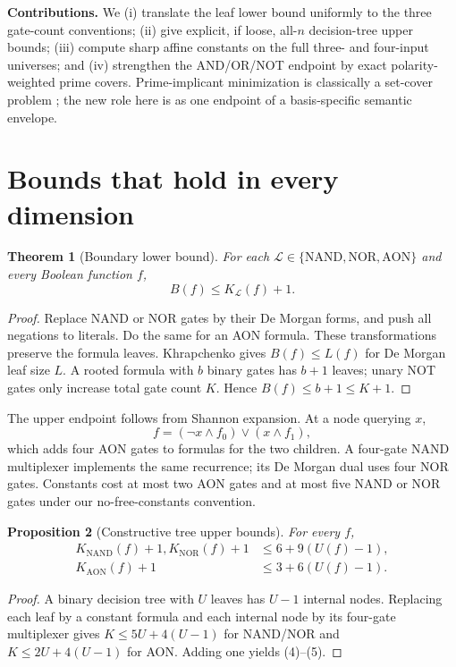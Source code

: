 \documentclass[10pt]{article}
\newtheorem{theorem}{Theorem}
\newtheorem{proposition}[theorem]{Proposition}
\newcommand{\AON}{\mathrm{AON}}
\begin{document}
\textbf{Contributions.}  We (i) translate the leaf lower bound uniformly to
the three gate-count conventions; (ii) give explicit, if loose, all-$n$
decision-tree upper bounds; (iii) compute sharp affine constants on the full
three- and four-input universes; and (iv) strengthen the AND/OR/NOT endpoint
by exact polarity-weighted prime covers.  Prime-implicant minimization is
classically a set-cover problem \cite{allender2006}; the new role here is as
one endpoint of a basis-specific semantic envelope.

\section{Bounds that hold in every dimension}

\begin{theorem}[Boundary lower bound]
For each $\mathcal L\in\{\mathrm{NAND},\mathrm{NOR},\AON\}$ and every Boolean
function $f$,
\begin{equation}
                  B(f)\le K_{\mathcal L}(f)+1.
\end{equation}
\end{theorem}
\begin{proof}
Replace NAND or NOR gates by their De Morgan forms, and push all negations to
literals.  Do the same for an AON formula.  These transformations preserve
the formula leaves.  Khrapchenko gives $B(f)\le L(f)$ for De Morgan leaf size
$L$.  A rooted formula with $b$ binary gates has $b+1$ leaves; unary NOT gates
only increase total gate count $K$.  Hence $B(f)\le b+1\le K+1$.
\end{proof}

The upper endpoint follows from Shannon expansion.  At a node querying $x$,
\begin{equation}
 f=(\neg x\wedge f_0)\vee(x\wedge f_1),
\end{equation}
which adds four AON gates to formulas for the two children.  A four-gate NAND
multiplexer implements the same recurrence; its De Morgan dual uses four NOR
gates.  Constants cost at most two AON gates and at most five NAND or NOR
gates under our no-free-constants convention.

\begin{proposition}[Constructive tree upper bounds]
For every $f$,
\begin{align}
 K_{\mathrm{NAND}}(f)+1, K_{\mathrm{NOR}}(f)+1
     &\le 6+9(U(f)-1),\\
 K_{\AON}(f)+1&\le 3+6(U(f)-1).
\end{align}
\end{proposition}
\begin{proof}
A binary decision tree with $U$ leaves has $U-1$ internal nodes.  Replacing
each leaf by a constant formula and each internal node by its four-gate
multiplexer gives $K\le5U+4(U-1)$ for NAND/NOR and
$K\le2U+4(U-1)$ for AON.  Adding one yields (4)--(5).
\end{proof}
\end{document}
